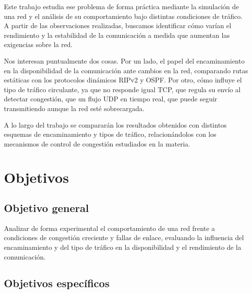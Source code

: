 \documentclass[11pt,a4paper]{article}
\begin{document}
Este trabajo estudia ese problema de forma pr\'actica mediante la simulaci\'on de una red y el an\'alisis de su comportamiento bajo distintas condiciones de tr\'afico. A partir de las observaciones realizadas, buscamos identificar c\'omo var\'ian el rendimiento y la estabilidad de la comunicaci\'on a medida que aumentan las exigencias sobre la red.

Nos interesan puntualmente dos cosas. Por un lado, el papel del encaminamiento en la disponibilidad de la comunicaci\'on ante cambios en la red, comparando rutas est\'aticas con los protocolos din\'amicos RIPv2 y OSPF. Por otro, c\'omo influye el tipo de tr\'afico circulante, ya que no responde igual TCP, que regula su env\'io al detectar congesti\'on, que un flujo UDP en tiempo real, que puede seguir transmitiendo aunque la red est\'e sobrecargada.

A lo largo del trabajo se comparar\'an los resultados obtenidos con distintos esquemas de encaminamiento y tipos de tr\'afico, relacion\'andolos con los mecanismos de control de congesti\'on estudiados en la materia.

\clearpage
\section*{Objetivos}

\subsection*{Objetivo general}

\noindent
Analizar de forma experimental el comportamiento de una red frente a condiciones de congesti\'on creciente y fallas de enlace, evaluando la influencia del encaminamiento y del tipo de tr\'afico en la disponibilidad y el rendimiento de la comunicaci\'on.

\subsection*{Objetivos espec\'ificos}
\end{document}
